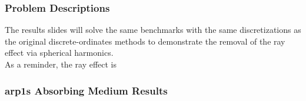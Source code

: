 \begin{frame}
  \frametitle{Problem Descriptions}
  The results slides will solve the same benchmarks with the same discretizations as the original discrete-ordinates methods to demonstrate the removal of the ray effect via spherical harmonics. \\

  As a reminder, the ray effect is
\end{frame}

\begin{frame}
  \frametitle{\glspl{arp1} Absorbing Medium Results}
\end{frame}
